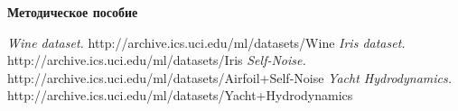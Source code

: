 \documentclass[12pt, twoside]{article}
\begin{document}
\begin{center}
{\LARGE \bf Методическое пособие}\\
\end{center}





















\begin{thebibliography}{99}
	\textit{Wine dataset.} http://archive.ics.uci.edu/ml/datasets/Wine
	\textit{Iris dataset.} http://archive.ics.uci.edu/ml/datasets/Iris
	\textit{Self-Noise.} http://archive.ics.uci.edu/ml/datasets/Airfoil+Self-Noise
	\textit{Yacht Hydrodynamics.} http://archive.ics.uci.edu/ml/datasets/Yacht+Hydrodynamics
\end{thebibliography}
\end{document}
